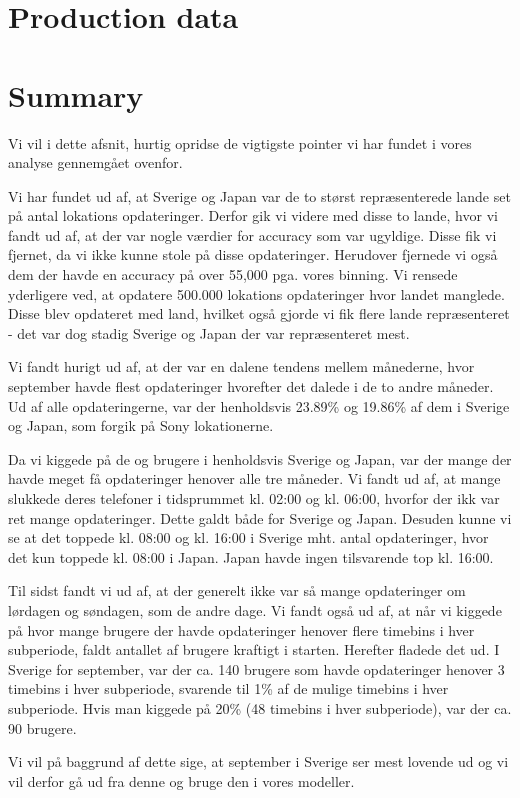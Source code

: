 \section{Production data}


\section{Summary}
Vi vil i dette afsnit, hurtig opridse de vigtigste pointer vi har fundet i vores analyse gennemgået ovenfor. 

Vi har fundet ud af, at Sverige og Japan var de to størst repræsenterede lande set på antal lokations opdateringer. Derfor gik vi videre med disse to lande, hvor vi fandt ud af, at der var nogle værdier for accuracy som var ugyldige. Disse fik vi fjernet, da vi ikke kunne stole på disse opdateringer. Herudover fjernede vi også dem der havde en accuracy på over 55,000 pga. vores binning. 
Vi rensede yderligere ved, at opdatere 500.000 lokations opdateringer hvor landet manglede. Disse blev opdateret med land, hvilket også gjorde vi fik flere lande repræsenteret - det var dog stadig Sverige og Japan der var repræsenteret mest. 

Vi fandt hurigt ud af, at der var en dalene tendens mellem månederne, hvor september havde flest opdateringer hvorefter det dalede i de to andre måneder. Ud af alle opdateringerne, var der henholdsvis 23.89\% og 19.86\% af dem i Sverige og Japan, som forgik på Sony lokationerne. 

Da vi kiggede på de \numberUsersSweden{} og \numberUsersJapan{} brugere i henholdsvis Sverige og Japan, var der mange der havde meget få opdateringer henover alle tre måneder. Vi fandt ud af, at mange slukkede deres telefoner i tidsprummet kl. 02:00 og kl. 06:00, hvorfor der ikk var ret mange opdateringer. Dette galdt både for Sverige og Japan. Desuden kunne vi se at det toppede kl. 08:00 og kl. 16:00 i Sverige mht. antal opdateringer, hvor det kun toppede kl. 08:00 i Japan. Japan havde ingen tilsvarende top kl. 16:00. 

Til sidst fandt vi ud af, at der generelt ikke var så mange opdateringer om lørdagen og søndagen, som de andre dage. Vi fandt også ud af, at når vi kiggede på hvor mange brugere der havde opdateringer henover flere timebins i  hver subperiode, faldt antallet af brugere kraftigt i starten. Herefter fladede det ud. I Sverige for september, var der ca. 140 brugere som havde opdateringer henover 3 timebins i hver subperiode, svarende til 1\% af de mulige timebins i hver subperiode. Hvis man kiggede på 20\% (48 timebins i hver subperiode), var der ca. 90 brugere. 

Vi vil på baggrund af dette sige, at september i Sverige ser mest lovende ud og vi vil derfor gå ud fra denne og bruge den i vores modeller. 